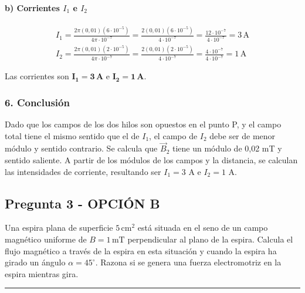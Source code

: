 \paragraph*{b) Corrientes $I_1$ e $I_2$}
\begin{gather}
    I_1 = \frac{2\pi (0,01) (6\cdot10^{-5})}{4\pi\cdot10^{-7}} = \frac{2 (0,01) (6\cdot10^{-5})}{4\cdot10^{-7}} = \frac{12\cdot10^{-7}}{4\cdot10^{-7}} = 3 \, \text{A} \\
    I_2 = \frac{2\pi (0,01) (2\cdot10^{-5})}{4\pi\cdot10^{-7}} = \frac{2 (0,01) (2\cdot10^{-5})}{4\cdot10^{-7}} = \frac{4\cdot10^{-7}}{4\cdot10^{-7}} = 1 \, \text{A}
\end{gather}
\begin{cajaresultado}
    Las corrientes son $\boldsymbol{I_1 = 3\,\textbf{A}}$ e $\boldsymbol{I_2 = 1\,\textbf{A}}$.
\end{cajaresultado}

\subsubsection*{6. Conclusión}
\begin{cajaconclusion}
Dado que los campos de los dos hilos son opuestos en el punto P, y el campo total tiene el mismo sentido que el de $I_1$, el campo de $I_2$ debe ser de menor módulo y sentido contrario. Se calcula que $\vec{B}_2$ tiene un módulo de 0,02 mT y sentido saliente. A partir de los módulos de los campos y la distancia, se calculan las intensidades de corriente, resultando ser $I_1=3$ A e $I_2=1$ A.
\end{cajaconclusion}

\newpage

\subsection{Pregunta 3 - OPCIÓN B}
\label{subsec:3B_2019_jul_ext}

\begin{cajaenunciado}
Una espira plana de superficie $5\,\text{cm}^2$ está situada en el seno de un campo magnético uniforme de $B=1\,\text{mT}$ perpendicular al plano de la espira. Calcula el flujo magnético a través de la espira en esta situación y cuando la espira ha girado un ángulo $\alpha=45^\circ$. Razona si se genera una fuerza electromotriz en la espira mientras gira.
\end{cajaenunciado}
\hrule

